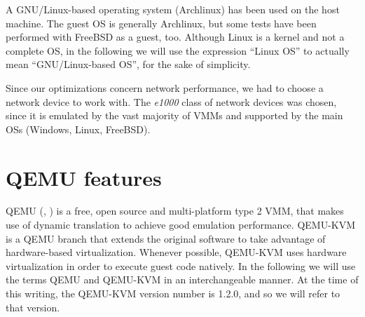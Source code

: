 A GNU/Linux-based operating system (Archlinux) has been used on the host machine. The guest OS is generally Archlinux, but 
some tests have been performed with FreeBSD as a guest, too. Although Linux is a kernel and not a complete OS, in the following we 
will use  the expression ``Linux OS'' to actually mean ``GNU/Linux-based OS'', for the sake of simplicity.

Since our optimizations concern network performance, we had to choose a network device to work with. The \emph{e1000} class of 
network devices was chosen, since it is emulated by the vast majority of VMMs and supported by the main OSs (Windows, Linux, FreeBSD).


\section{QEMU features}
QEMU (\cite{ref:qemu}, \cite{ref:qemu-paper}) is a free, open source and multi-platform type 2 VMM, that makes use of dynamic translation to
achieve good emulation performance. QEMU-KVM is a QEMU branch that extends the original software to take advantage of hardware-based 
virtualization. Whenever possible, QEMU-KVM uses hardware virtualization in order to execute guest code natively.
In the following we will use the terms QEMU and QEMU-KVM in an interchangeable manner.
At the time of this writing, the QEMU-KVM version number is 1.2.0, and so we will refer to that version.

\vspace{0.5cm}


